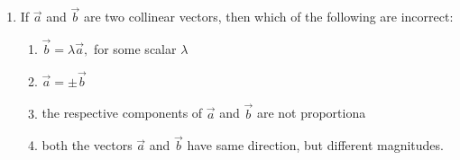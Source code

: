 \documentclass[12pt]{article}
\begin{document}
\begin{enumerate}
\item If $\vec{a}$ and $\vec{b}$ are two collinear vectors, then which of the following are incorrect:
\begin{enumerate}
    \item $\vec{b}=\lambda\vec{a},$
 for some scalar $\lambda$
    \item $\vec{a}=\pm\vec{b}$
    \item the respective components of $\vec{a}$ and $\vec{b}$ are not proportiona
    \item both the vectors $\vec{a}$ and $\vec{b}$ have same direction, but different magnitudes.
\end{enumerate}
\end{enumerate}
\end{document}
